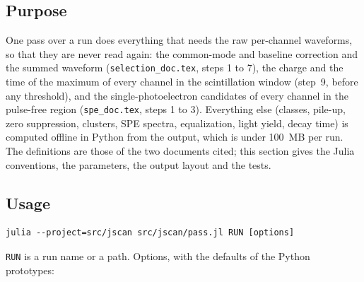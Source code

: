 \documentclass[11pt]{article}
\newcommand{\code}[1]{\texttt{#1}}
\begin{document}
\subsection{Purpose}

One pass over a run does everything that needs the raw per-channel
waveforms, so that they are never read again: the common-mode and baseline
correction and the summed waveform (\code{selection\_doc.tex}, steps 1 to
7), the charge and the time of the maximum of every channel in the
scintillation window (step~9, before any threshold), and the
single-photoelectron candidates of every channel in the pulse-free region
(\code{spe\_doc.tex}, steps 1 to 3). Everything else (classes, pile-up, zero
suppression, clusters, SPE spectra, equalization, light yield, decay time)
is computed offline in Python from the output, which is under 100~MB per
run. The definitions are those of the two documents cited; this section
gives the Julia conventions, the parameters, the output layout and the
tests.

\subsection{Usage}

\begin{lstlisting}
julia --project=src/jscan src/jscan/pass.jl RUN [options]
\end{lstlisting}

\code{RUN} is a run name or a path. Options, with the defaults of the
Python prototypes:
\end{document}
